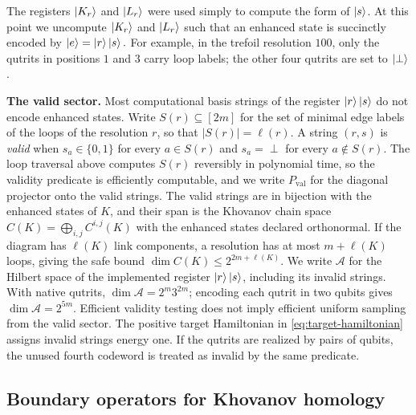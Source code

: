 \documentclass[a4paper,onecolumn,unpublished]{quantumarticle}
\theoremstyle{plain}
\theoremstyle{definition}
\theoremstyle{definition}
\numberwithin{equation}{section}
\begin{document}
  The registers $\ket{K_r}$ and $\ket{L_r}$ were used simply to compute the form of $\ket{s}$.  At this point we uncompute $\ket{K_r}$ and $\ket{L_r}$ such that an enhanced state is succinctly encoded by $
    \ket{e} = \ket{r}\ket{s}.$
For example, in the trefoil resolution $100$, only the qutrits in positions $1$ and $3$ carry loop labels; the other four qutrits are set to $\ket{\perp}$.

\smallskip
\noindent \textbf{The valid sector.}  Most computational basis strings of the register $\ket{r}\ket{s}$ do not encode enhanced states.  Write $S(r)\subseteq[2m]$ for the set of minimal edge labels of the loops of the resolution $r$, so that $|S(r)|=\ell(r)$.  A string $(r,s)$ is \emph{valid} when $s_a\in\{0,1\}$ for every $a\in S(r)$ and $s_a=\perp$ for every $a\notin S(r)$.  The loop traversal above computes $S(r)$ reversibly in polynomial time, so the validity predicate is efficiently computable, and we write $P_{\mathrm{val}}$ for the diagonal projector onto the valid strings.  The valid strings are in bijection with the enhanced states of $K$, and their span is the Khovanov chain space $C(K)=\bigoplus_{i,j}C^{i,j}(K)$ with the enhanced states declared orthonormal.  If the diagram has $\ell(K)$ link components, a resolution has at most $m+\ell(K)$ loops, giving the safe bound $\dim C(K)\leq2^{2m+\ell(K)}$. We write $\mathcal A$ for the Hilbert space of the implemented register $\ket{r}\ket{s}$, including its invalid strings. With native qutrits, $\dim\mathcal A=2^m3^{2m}$; encoding each qutrit in two qubits gives $\dim\mathcal A=2^{5m}$. Efficient validity testing does not imply efficient uniform sampling from the valid sector. The positive target Hamiltonian in \cref{eq:target-hamiltonian} assigns invalid strings energy one.  If the qutrits are realized by pairs of qubits, the unused fourth codeword is treated as invalid by the same predicate.


\subsection{Boundary operators for Khovanov homology} \label{subsec:Kh-boundary}
\end{document}
